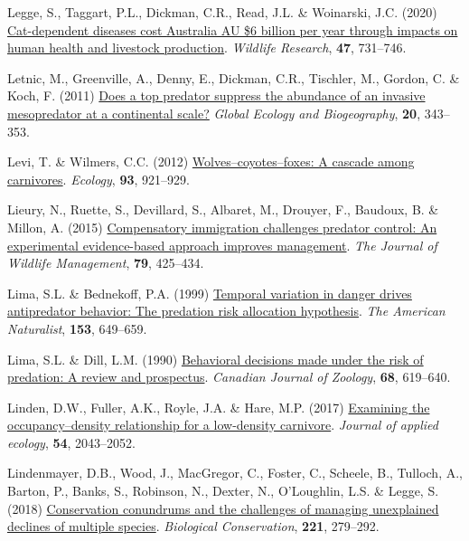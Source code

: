 \documentclass[11pt,a4paper,titlepage,twoside,openright]{style/unimelbthesis}
\newenvironment{CSLReferences}%
  {}%
  {\par}
\begin{document}
\begin{mainmatter}
\begin{CSLReferences}{1}{0}
\leavevmode{}%
Legge, S., Taggart, P.L., Dickman, C.R., Read, J.L. \& Woinarski, J.C. (2020) \href{https://doi.org/10.1071/WR20089}{Cat-dependent diseases cost {Australia AU \$6} billion per year through impacts on human health and livestock production}. \emph{Wildlife Research}, \textbf{47}, 731--746.

\leavevmode{}%
Letnic, M., Greenville, A., Denny, E., Dickman, C.R., Tischler, M., Gordon, C. \& Koch, F. (2011) \href{https://doi.org/10.1111/j.1466-8238.2010.00600.x}{Does a top predator suppress the abundance of an invasive mesopredator at a continental scale?} \emph{Global Ecology and Biogeography}, \textbf{20}, 343--353.

\leavevmode{}%
Levi, T. \& Wilmers, C.C. (2012) \href{https://doi.org/10.1890/11-0165.1}{Wolves--coyotes--foxes: A cascade among carnivores}. \emph{Ecology}, \textbf{93}, 921--929.

\leavevmode{}%
Lieury, N., Ruette, S., Devillard, S., Albaret, M., Drouyer, F., Baudoux, B. \& Millon, A. (2015) \href{https://doi.org/10.1002/jwmg.850}{Compensatory immigration challenges predator control: An experimental evidence-based approach improves management}. \emph{The Journal of Wildlife Management}, \textbf{79}, 425--434.

\leavevmode{}%
Lima, S.L. \& Bednekoff, P.A. (1999) \href{https://doi.org/10.1086/303202}{Temporal variation in danger drives antipredator behavior: The predation risk allocation hypothesis}. \emph{The American Naturalist}, \textbf{153}, 649--659.

\leavevmode{}%
Lima, S.L. \& Dill, L.M. (1990) \href{https://doi.org/10.1139/z90-092}{Behavioral decisions made under the risk of predation: A review and prospectus}. \emph{Canadian Journal of Zoology}, \textbf{68}, 619--640.

\leavevmode{}%
Linden, D.W., Fuller, A.K., Royle, J.A. \& Hare, M.P. (2017) \href{https://doi.org/10.1111/1365-2664.12883}{Examining the occupancy--density relationship for a low-density carnivore}. \emph{Journal of applied ecology}, \textbf{54}, 2043--2052.

\leavevmode{}%
Lindenmayer, D.B., Wood, J., MacGregor, C., Foster, C., Scheele, B., Tulloch, A., Barton, P., Banks, S., Robinson, N., Dexter, N., O'Loughlin, L.S. \& Legge, S. (2018) \href{https://doi.org/10.1016/j.biocon.2018.03.007}{Conservation conundrums and the challenges of managing unexplained declines of multiple species}. \emph{Biological Conservation}, \textbf{221}, 279--292.


\end{CSLReferences}
\end{mainmatter}
\end{document}
